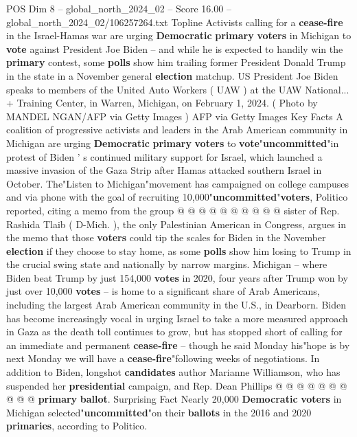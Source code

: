\begin{textsample}{POS Dim 8 – global\_north\_2024\_02 – Score 16.00 – global\_north\_2024\_02/106257264.txt}  \label{ex:f8_pos_022}
Topline Activists calling for a \textbf{cease-fire} in the Israel-Hamas war are urging \textbf{Democratic} \textbf{primary} \textbf{voters} in Michigan to \textbf{vote} against President Joe Biden -- and while he is expected to handily win the \textbf{primary} contest, some \textbf{polls} show him trailing former President Donald Trump in the state in a November general \textbf{election} matchup.
US President Joe Biden speaks to members of the United Auto Workers ( UAW ) at the UAW National... + Training Center, in Warren, Michigan, on February 1, 2024. ( Photo by MANDEL NGAN/AFP via Getty Images ) AFP via Getty Images Key Facts A coalition of progressive activists and leaders in the Arab American community in Michigan are urging \textbf{Democratic} \textbf{primary} \textbf{voters} to \textbf{vote}"\textbf{uncommitted}"in protest of Biden ' s continued military support for Israel, which launched a massive invasion of the Gaza Strip after Hamas attacked southern Israel in October.
The"Listen to Michigan"movement has campaigned on college campuses and via phone with the goal of recruiting 10,000"\textbf{uncommitted}"\textbf{voters}, Politico reported, citing a memo from the group @ @ @ @ @ @ @ @ @ @ sister of Rep.
Rashida Tlaib ( D-Mich. ), the only Palestinian American in Congress, argues in the memo that those \textbf{voters} could tip the scales for Biden in the November \textbf{election} if they choose to stay home, as some \textbf{polls} show him losing to Trump in the crucial swing state and nationally by narrow margins.
Michigan -- where Biden beat Trump by just 154,000 \textbf{votes} in 2020, four years after Trump won by just over 10,000 \textbf{votes} -- is home to a significant share of Arab Americans, including the largest Arab American community in the U.S., in Dearborn.
Biden has become increasingly vocal in urging Israel to take a more measured approach in Gaza as the death toll continues to grow, but has stopped short of calling for an immediate and permanent \textbf{cease-fire} -- though he said Monday his"hope is by next Monday we will have a \textbf{cease-fire}"following weeks of negotiations.
In addition to Biden, longshot \textbf{candidates} author Marianne Williamson, who has suspended her \textbf{presidential} campaign, and Rep.
Dean Phillips @ @ @ @ @ @ @ @ @ @ \textbf{primary} \textbf{ballot}.
Surprising Fact Nearly 20,000 \textbf{Democratic} \textbf{voters} in Michigan selected"\textbf{uncommitted}"on their \textbf{ballots} in the 2016 and 2020 \textbf{primaries}, according to Politico.

\end{textsample}
